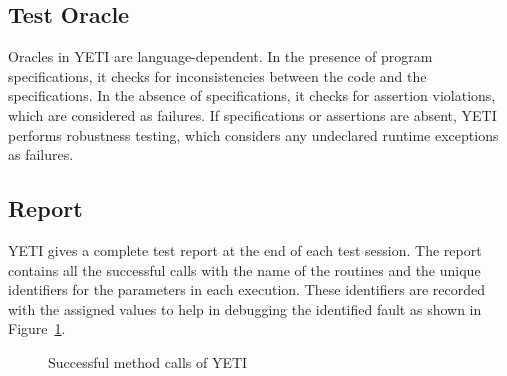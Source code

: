 \subsection{Test Oracle}
Oracles in YETI are language-dependent. In the presence of program specifications, it checks for inconsistencies between the code and the specifications. In the absence of specifications, it checks for assertion violations, which are considered as failures. %
If specifications or assertions are absent, YETI performs robustness testing, which considers any undeclared runtime exceptions as failures. 


\subsection{Report}
YETI gives a complete test report at the end of each test session. The report contains all the successful calls with the name of the routines and the unique identifiers for the parameters in each execution. These identifiers are recorded with the assigned values to help in debugging the identified fault as shown in Figure~\ref{successReport}. 
\bigskip
\begin{figure}[H]
	\centering
	\smallskip
	\caption{Successful method calls of YETI}
	\label{successReport}
\end{figure}

